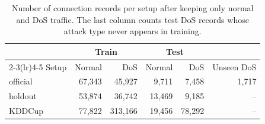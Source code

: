 \begin{table}[t]
\centering
\caption{Number of connection records per setup after keeping only normal and DoS traffic. The last column counts test DoS records whose attack type never appears in training.}
\label{tab:data}
\footnotesize
\setlength{\tabcolsep}{2.5pt}
\begin{tabular}{lrrrrr}
\toprule
 & \multicolumn{2}{c}{Train} & \multicolumn{2}{c}{Test} & \\
\cmidrule(lr){2-3}\cmidrule(lr){4-5}
Setup & Normal & DoS & Normal & DoS & Unseen DoS \\
\midrule
official & 67{,}343 & 45{,}927 & 9{,}711 & 7{,}458 & 1{,}717 \\
holdout & 53{,}874 & 36{,}742 & 13{,}469 & 9{,}185 & -- \\
KDDCup & 77{,}822 & 313{,}166 & 19{,}456 & 78{,}292 & -- \\
\bottomrule
\end{tabular}
\end{table}
